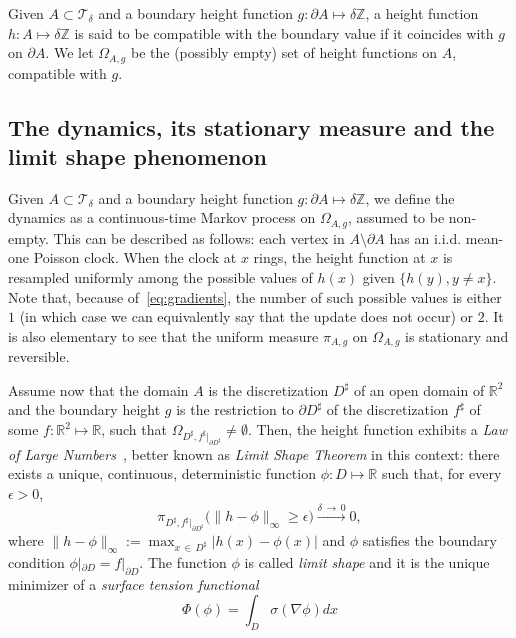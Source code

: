 \documentclass[10pt]{amsart}
\theoremstyle{definition}\newtheorem{defi}[theo]{Definition}\newtheorem{rema}[theo]{Remark}\newtheorem{exam}[theo]{Example}\newtheorem{exem}[theo]{Example}\newtheorem{nota}[theo]{Notation}
\newcommand{\R}{\mathbb{R}}
\newcommand{\Z}{\mathbb{Z}}
\newcommand{\clT}{\mathcal{T}}
\renewcommand{\d}{{\sharp }}
\begin{document}
Given $A\subset \clT_\delta$ and a boundary height function $g:\partial A\mapsto \delta\Z$, a height function $h:A\mapsto \delta \Z$ is said to be compatible with the boundary value if it coincides with $g$ on $\partial A$. We let $\Omega_{A,g}$ be the (possibly empty) set of height functions on $A$, compatible with $g$.


\subsection{The dynamics, its stationary measure and the limit shape phenomenon}

Given $A\subset \clT_\delta$ and a boundary height function $g:\partial A\mapsto \delta\Z$, we define the dynamics as a continuous-time Markov process on $\Omega_{A,g}$, assumed to be non-empty. This can be described as follows: each vertex in $A\setminus \partial A$ has an i.i.d. mean-one Poisson clock. When the clock at $x$ rings, the height function at $x$ is resampled uniformly among the possible values of $h(x)$ given $\{h(y),y\ne x\}$. Note that, because of~\eqref{eq:gradients}, the number of such possible values is either $1$ (in which case we can equivalently say that the update does not occur) or $2$. It is also elementary to see that the uniform measure $\pi_{A,g}$ on $\Omega_{A,g}$ is stationary and reversible.

Assume now that the domain $A$ is the discretization $D^\d$ of an open domain of $\R^2$ and the boundary height $g$ is the restriction to $\partial D^\d$ of the discretization $f^\d$ of some $f:\R^2\mapsto
\R$, such that $\Omega_{D^\d,f^\d|_{\partial D^\d}}\ne\emptyset$. Then, the height function exhibits a \emph{Law of Large Numbers}~\cite{CKP,CLP}, better known as \emph{Limit Shape Theorem} in this context: there exists a unique, continuous, deterministic function $\phi:D\mapsto \R$ such that, for every $\epsilon>0$,
\begin{equation}\label{Eq:limshape}
\pi_{D^\d,f^\d|_{\partial D^\d}}\big(\|h-\phi\|_\infty\ge \epsilon\big)\stackrel{\delta\,\to\,0}\longrightarrow0,
\end{equation}
where $\|h-\phi\|_\infty:=\max_{x\,\in\,D^\d}|h(x)-\phi(x)|$ and $\phi$ satisfies the boundary condition $\phi|_{\partial D}=f|_{\partial D}$. The function $\phi$ is called \emph{limit shape} and it is the unique minimizer of a \emph{surface tension functional}
\begin{equation}
\Phi(\phi)=\int_D \sigma(\nabla \phi)dx
\end{equation}
\end{document}
